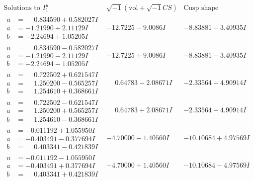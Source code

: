 \documentclass[1p]{elsarticle_modified}
\theoremstyle{definition}
\newcommand{\I}{\sqrt{-1}}
\begin{document}
$$\begin{array}{c|c|c}  
\text{Solutions to }I^u_{1}& \I (\text{vol} + \sqrt{-1}CS) & \text{Cusp shape}\\
 \hline 
\begin{aligned}
u &= \phantom{-}0.834590 + 0.582027 I \\
a &= -1.21990 + 2.11129 I \\
b &= -2.24694 + 1.05205 I\end{aligned}
 & -12.7225 - 9.0086 I & -8.83881 + 3.40935 I \\ \hline\begin{aligned}
u &= \phantom{-}0.834590 - 0.582027 I \\
a &= -1.21990 - 2.11129 I \\
b &= -2.24694 - 1.05205 I\end{aligned}
 & -12.7225 + 9.0086 I & -8.83881 - 3.40935 I \\ \hline\begin{aligned}
u &= \phantom{-}0.722502 + 0.621547 I \\
a &= \phantom{-}1.250200 - 0.565257 I \\
b &= \phantom{-}1.254610 + 0.368661 I\end{aligned}
 & \phantom{-}0.64783 - 2.08671 I & -2.33564 + 4.90914 I \\ \hline\begin{aligned}
u &= \phantom{-}0.722502 - 0.621547 I \\
a &= \phantom{-}1.250200 + 0.565257 I \\
b &= \phantom{-}1.254610 - 0.368661 I\end{aligned}
 & \phantom{-}0.64783 + 2.08671 I & -2.33564 - 4.90914 I \\ \hline\begin{aligned}
u &= -0.011192 + 1.055950 I \\
a &= -0.403491 - 0.377694 I \\
b &= \phantom{-}0.403341 - 0.421839 I\end{aligned}
 & -4.70000 - 1.40560 I & -10.10684 + 4.97569 I \\ \hline\begin{aligned}
u &= -0.011192 - 1.055950 I \\
a &= -0.403491 + 0.377694 I \\
b &= \phantom{-}0.403341 + 0.421839 I\end{aligned}
 & -4.70000 + 1.40560 I & -10.10684 - 4.97569 I \\ \hline\begin{aligned}

\end{aligned}
\end{array}$$
\end{document}
